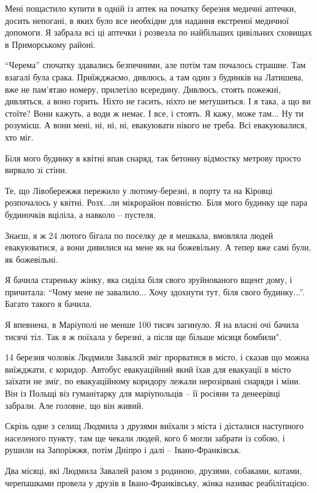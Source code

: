 Мені пощастило купити в одній із аптек на початку березня медичні аптечки,
досить непогані, в яких було все необхідне для надання екстреної медичної
допомоги. Я забрала всі ці аптечки і розвезла по найбільших цивільних сховищах
в Приморському районі. 

\enquote{Черема} спочатку здавались безпечними, але потім там почалось страшне. Там
взагалі була срака. Приїжджаємо, дивлюсь, а там один з будинків на Латишева,
вже не пам'ятаю номеру, прилетіло всередину. Дивлюсь, стоять пожежні,
дивляться, а воно горить. Ніхто не гасить, ніхто не метушиться. І я така, а що
ви стоїте? Вони кажуть, а води ж немає. І все, і стоять. Я кажу, може там... Ну
ти розумієш. А вони мені,  ні, ні, ні, евакуювати нікого не треба. Всі
евакуювалися, хто міг.

Біля мого будинку в квітні впав снаряд, так бетонну відмостку метрову просто
вирвало зі стіни.

Те, що Лівобережжя пережило у лютому-березні, в порту та на Кіровці розпочалось
у квітні. Розх...ли мікрорайон повністю. Біля мого будинку ще пара будиночків
вціліла, а навколо – пустеля.

Знаєш, я ж 24 лютого бігала по поселку де я мешкала, вмовляла людей
евакуюватися, а вони дивилися на мене як на божевільну. А тепер вже самі були,
як божевільні.

Я бачила стареньку жінку, яка сиділа біля свого зруйнованого вщент дому, і
причитала: \enquote{Чому мене не завалило... Хочу здохнути тут, біля свого будинку...}.
Багато такого я бачила.

Я впевнена, в Маріуполі не менше 100 тисяч загинуло. Я на власні очі бачила
тисячі тіл. Так я ж поїхала у березні, а після ще більше місяця бомбили".

14 березня чоловік Людмили Завалєй зміг прорватися в місто, і сказав що можна
виїжджати, є коридор.  Автобус евакуаційний який їхав для евакуації в місто
заїхати не зміг, по евакуаційному коридору лежали нерозірвані снаряди і міни.
Він із Польщі віз гуманітарку для маріупольців  – її росіяни та денеерівці
забрали. Але головне, що він живий.

Скрізь одне з селищ Людмила з друзями виїхали з міста і дісталися наступного
населеного пункту, там ще чекали людей, кого б могли забрати із собою, і рушили
на Запоріжжя, потім Дніпро і далі – Івано-Франківськ. 

Два місяці, які Людмила Завалей разом з родиною, друзями, собаками, котами,
черепашками провела у друзів в Івано-Франківську, жінка називає реабілітацією.

